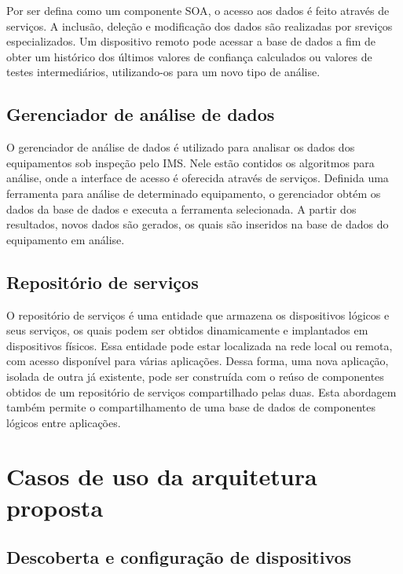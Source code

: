 Por ser defina como um componente \gls{SOA}, o acesso aos dados é feito através de serviços. A
inclusão, deleção e modificação dos dados são realizadas por sreviços especializados. Um dispositivo
remoto pode acessar a base de dados a fim de obter um histórico dos últimos valores de confiança
calculados ou valores de testes intermediários, utilizando-os para um novo tipo de análise.


\subsection{Gerenciador de análise de dados}

O gerenciador de análise de dados é utilizado para analisar os dados dos equipamentos sob inspeção
pelo \gls{IMS}. Nele estão contidos os algoritmos para análise, onde a interface de acesso é
oferecida através de serviços. Definida uma ferramenta para análise de determinado equipamento, o
gerenciador obtém os dados da base de dados e executa a ferramenta selecionada. A partir dos
resultados, novos dados são gerados, os quais são inseridos na base de dados do equipamento em
análise.


\subsection{Repositório de serviços}

O repositório de serviços é uma entidade que armazena os dispositivos lógicos e seus serviços, os
quais podem ser obtidos dinamicamente e implantados em dispositivos físicos. Essa entidade pode
estar localizada na rede local ou remota, com acesso disponível para várias aplicações. Dessa forma,
uma nova aplicação, isolada de outra já existente, pode ser construída com o reúso de componentes
obtidos de um repositório de serviços compartilhado pelas duas. Esta abordagem também permite o
compartilhamento de uma base de dados de componentes lógicos entre aplicações.


\section{Casos de uso da arquitetura proposta}



\subsection{Descoberta e configuração de dispositivos}


